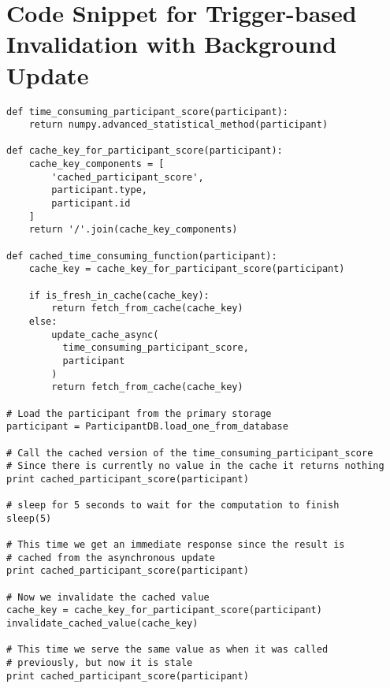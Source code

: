 \section{Code Snippet for Trigger-based Invalidation with Background Update}
\label{appendix:code:trigger-based-invalidation-with-background-update}

\begin{verbatim}
def time_consuming_participant_score(participant):
    return numpy.advanced_statistical_method(participant)

def cache_key_for_participant_score(participant):
    cache_key_components = [
        'cached_participant_score',
        participant.type,
        participant.id
    ]
    return '/'.join(cache_key_components)

def cached_time_consuming_function(participant):
    cache_key = cache_key_for_participant_score(participant)

    if is_fresh_in_cache(cache_key):
        return fetch_from_cache(cache_key)
    else:
        update_cache_async(
          time_consuming_participant_score,
          participant
        )
        return fetch_from_cache(cache_key)

# Load the participant from the primary storage
participant = ParticipantDB.load_one_from_database

# Call the cached version of the time_consuming_participant_score
# Since there is currently no value in the cache it returns nothing
print cached_participant_score(participant)

# sleep for 5 seconds to wait for the computation to finish
sleep(5)

# This time we get an immediate response since the result is
# cached from the asynchronous update
print cached_participant_score(participant)

# Now we invalidate the cached value
cache_key = cache_key_for_participant_score(participant)
invalidate_cached_value(cache_key)

# This time we serve the same value as when it was called
# previously, but now it is stale
print cached_participant_score(participant)
\end{verbatim}

